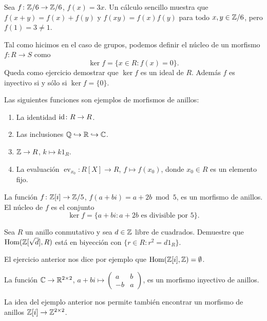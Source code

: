 \begin{example}
Sea $f\colon\mathbb{Z}/6\to\mathbb{Z}/6$, $f(x)=3x$. Un cálculo sencillo muestra que $f(x+y)=f(x)+f(y)$ y 
$f(xy)=f(x)f(y)$ para todo $x,y\in\mathbb{Z}/6$, pero $f(1)=3\ne 1$.	
\end{example}

Tal como hicimos en el caso de grupos, podemos definir el núcleo de un morfismo $f\colon R\to S$ como
\[
\ker f=\{x\in R:f(x)=0\}.
\]
Queda como ejercicio demostrar que $\ker f$ es un ideal de $R$. Además $f$ es inyectivo si y sólo si $\ker f=\{0\}$.  

\begin{examples}
Las siguientes funciones son ejemplos de morfismos de anillos:
\begin{enumerate}
	\item La identidad $\operatorname{id}\colon R\to R$.
	\item Las inclusiones $\mathbb{Q}\hookrightarrow\mathbb{R}\hookrightarrow\mathbb{C}$.
	\item $\mathbb{Z}\to R$, $k\mapsto k1_R$.
	\item La evaluación $\operatorname{ev}_{x_0}\colon R[X]\to R$, $f\mapsto f(x_0)$, donde $x_0\in R$ es un elemento fijo. 
\end{enumerate}
\end{examples}

\begin{example}
La función $f\colon\mathbb{Z}[i]\to\mathbb{Z}/5$, $f(a+bi)=a+2b\bmod 5$, es un morfismo de anillos.	El núcleo de $f$
es el conjunto
\[
\ker f=\{a+bi:a+2b\text{ es divisible por 5}\}.
\] 
\end{example}

\begin{exercise}
\label{xca:Zsqrtd}
Sea $R$ un anillo conmutativo y sea $d\in\mathbb{Z}$ libre de cuadrados.  
Demuestre que $\operatorname{Hom}(\mathbb{Z}[\sqrt{d}],R)$ está en biyección con $\{r\in R:r^2=d1_R\}$. 
\end{exercise}

El ejercicio anterior nos dice por ejemplo que $\operatorname{Hom}(\mathbb{Z}[i],\mathbb{Z})=\emptyset$. 

\begin{example}
La función $\mathbb{C}\to\mathbb{R}^{2\times 2}$, $a+bi\mapsto\begin{pmatrix}a&b\\-b&a\end{pmatrix}$, es un morfismo inyectivo  
de anillos. 
\end{example}

La idea
del ejemplo anterior nos permite también encontrar 
un morfismo de anillos 
$\mathbb{Z}[i]\to\mathbb{Z}^{2\times 2}$.  	


